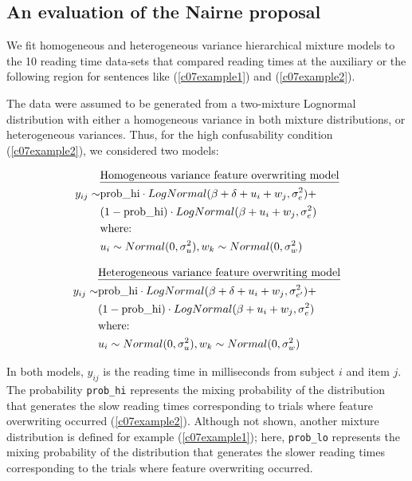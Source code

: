 \documentclass{cambridge7A}\usepackage[]{graphicx}\usepackage[]{color}
\begin{document}
\subsection{An evaluation of the Nairne proposal}

We fit homogeneous and heterogeneous variance hierarchical mixture models to the 10 reading time data-sets that compared reading times at the auxiliary or the following region for sentences like (\ref{c07example1}) and (\ref{c07example2}). 

The data were assumed to be generated from a two-mixture Lognormal distribution with either a homogeneous variance in both mixture distributions, or heterogeneous variances. 
Thus, for the high confusability condition (\ref{c07example2}), we considered two models:

\begin{equation}
\begin{split}
       ~&\hbox{\underline{Homogeneous variance feature overwriting model}}\\
y_{ij} \sim& \hbox{prob\_hi} \cdot LogNormal(\beta+\delta+u_i+w_j,\sigma_{e}^2)+\\
           ~& (1-\hbox{prob\_hi}) \cdot LogNormal(\beta+u_i+w_j,\sigma_e^2)\\
           ~& \hbox{where: }\\
           ~& u_i \sim Normal(0,\sigma_u^2), w_k \sim Normal(0,\sigma_w^2)\\ 
\end{split}
\end{equation}


\begin{equation}
\begin{split}
       ~&\hbox{\underline{Heterogeneous variance feature overwriting model}}\\
y_{ij}
\sim& \hbox{prob\_hi} \cdot LogNormal(\beta+\delta+u_i+w_j,\sigma_{e'}^2)+\\
           ~& (1-\hbox{prob\_hi}) \cdot LogNormal(\beta+u_i+w_j,\sigma_e^2)\\
           ~& \hbox{where: }\\
           ~& u_i \sim Normal(0,\sigma_u^2), w_k \sim Normal(0,\sigma_w^2)\\ 
\end{split}
\end{equation}


\noindent
In both models, 
$y_{ij}$ 
is the reading time in milliseconds from subject $i$ and item $j$.  The probability  \texttt{prob\_hi} represents the mixing probability of the distribution that generates the slow reading times corresponding to trials where feature overwriting occurred (\ref{c07example2}). Although not shown, another mixture distribution is defined for example (\ref{c07example1}); here, 
\texttt{prob\_lo} represents the mixing probability of the distribution that generates the slower reading times corresponding to the trials where feature overwriting occurred. 
\end{document}

